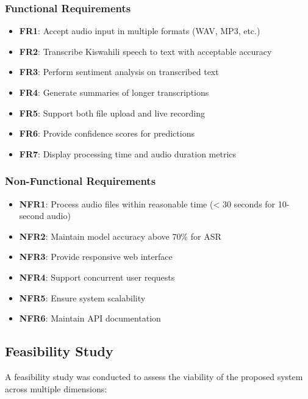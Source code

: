 \documentclass[12pt,a4paper]{report}
\begin{document}
\subsubsection{Functional Requirements}
\begin{itemize}
    \item \textbf{FR1}: Accept audio input in multiple formats (WAV, MP3, etc.)
    \item \textbf{FR2}: Transcribe Kiswahili speech to text with acceptable accuracy
    \item \textbf{FR3}: Perform sentiment analysis on transcribed text
    \item \textbf{FR4}: Generate summaries of longer transcriptions
    \item \textbf{FR5}: Support both file upload and live recording
    \item \textbf{FR6}: Provide confidence scores for predictions
    \item \textbf{FR7}: Display processing time and audio duration metrics
\end{itemize}

\subsubsection{Non-Functional Requirements}
\begin{itemize}
    \item \textbf{NFR1}: Process audio files within reasonable time (< 30 seconds for 10-second audio)
    \item \textbf{NFR2}: Maintain model accuracy above 70\% for ASR
    \item \textbf{NFR3}: Provide responsive web interface
    \item \textbf{NFR4}: Support concurrent user requests
    \item \textbf{NFR5}: Ensure system scalability
    \item \textbf{NFR6}: Maintain API documentation
\end{itemize}

\subsection{Feasibility Study}
A feasibility study was conducted to assess the viability of the proposed system across multiple dimensions:
\end{document}
